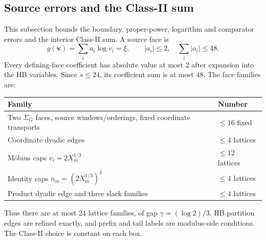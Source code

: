 \subsection{Source errors and the Class-II sum}

This subsection bounds the boundary, proper-power, logarithm and comparator errors and the interior Class-II sum.
A source face is
\[
g(\mathbf v)=\sum_ia_i\log v_i=\xi,\qquad
 |a_i|\le2,\quad\sum_i|a_i|\le48.
 \tag{4.36}
\]
Every defining-face coefficient has absolute value at most 2 after
expansion into the HB variables. Since $s\le24$, its coefficient sum
is at most 48.
The face families are:
\begin{center}
\begin{tabular}{@{}p{}l@{}}
\toprule
Family & Number \\
\midrule
Two $\Sigma_G$ faces, source windows/orderings, fixed coordinate transports & $\le16$ fixed \\
Coordinate dyadic edges & $\le4$ lattices \\
M\"obius caps $v_i=2X_m^{1/3}$ & $\le12$ lattices \\
Identity caps $n_m=(2X_m^{1/3})^3$ & $\le4$ lattices \\
Product dyadic edge and three slack families & $\le4$ lattices \\
\bottomrule
\end{tabular}
\end{center}
Thus there are at most 24 lattice families, of gap $\gamma=(\log2)/3$.
HB partition edges are refined exactly, and prefix and tail labels are modulus-side conditions.
The Class-II choice is constant on each box.


